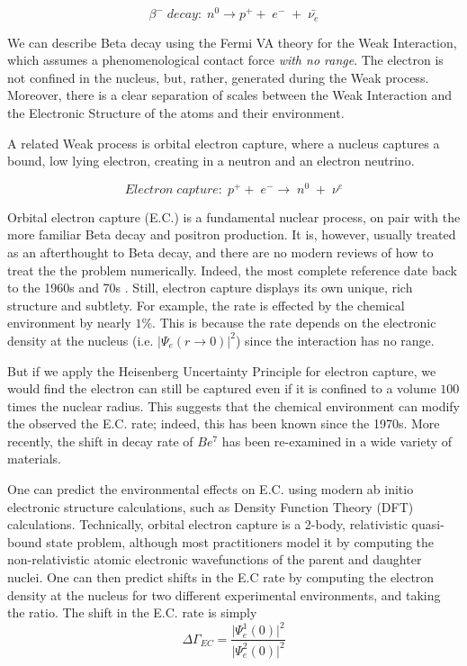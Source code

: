 \documentclass[%
 aip,
 jmp,%
 amsmath,amssymb,
 reprint,%
]{revtex4-1}
\begin{document}
$$\beta^{-}\;decay:\;n^{0}\rightarrow p^{+}+\;e^{-}\;+\;\bar{\nu_{e}}$$

We can describe Beta decay using the Fermi VA theory for the Weak Interaction, which assumes a phenomenological contact force \emph{with no range}.
The electron is not confined in the nucleus, but, rather, generated during the Weak process.  Moreover, there is a clear separation of scales between the Weak Interaction and the Electronic Structure of the atoms and their environment.

A related Weak process is orbital electron capture, where a nucleus captures a bound, low lying electron, creating in a neutron and an electron neutrino.

$$Electron\;capture:\;p^{+}+\;e^{-}\rightarrow\;n^{0}\;+\;\nu^{e}$$

Orbital electron capture (E.C.) is a fundamental  nuclear process, on pair with the more familiar Beta decay and positron production. It is, however, usually treated as an afterthought to Beta decay, and there are no modern reviews of how to treat the the problem numerically.  Indeed, the most complete reference date back to the 1960s and 70s \cite{ec-review1,ec-review2}.  Still, electron capture displays its own unique, rich structure and subtlety.  For example, the rate is effected by the chemical environment by nearly $1\%$. This is because the rate depends on the electronic density at the nucleus (i.e. $\vert\Psi_{e}(r\rightarrow 0)\vert^{2}$) since the interaction has no range. 

But if we apply the Heisenberg Uncertainty Principle for electron capture, we would find the electron can still be captured even if it is confined to a volume $100$ times the nuclear radius.    This suggests that the chemical environment can modify the observed the E.C. rate; indeed, this has been known since the 1970s\cite{emery}.  More recently, the shift in decay rate of $Be^{7}$ has been re-examined in a wide variety of materials.\cite{RAY2009106}

One can predict the environmental effects on E.C. using modern ab initio electronic structure calculations, such as Density Function Theory (DFT) calculations.\cite{PhysRevC.71.025801}   Technically, orbital electron capture is a 2-body, relativistic quasi-bound state problem, although most practitioners model it by computing the non-relativistic atomic electronic wavefunctions of the parent and daughter nuclei. One can then predict  shifts in the E.C rate by  computing the electron density at the nucleus for two different experimental environments, and taking the ratio.  The shift in the E.C. rate is simply 
$$\Delta\Gamma_{EC}=\dfrac{\big\vert\Psi^{1}_{e}(0)\big\vert^{2}} {\big\vert\Psi^{2}_{e}(0)\big\vert^{2}} $$
\end{document}
